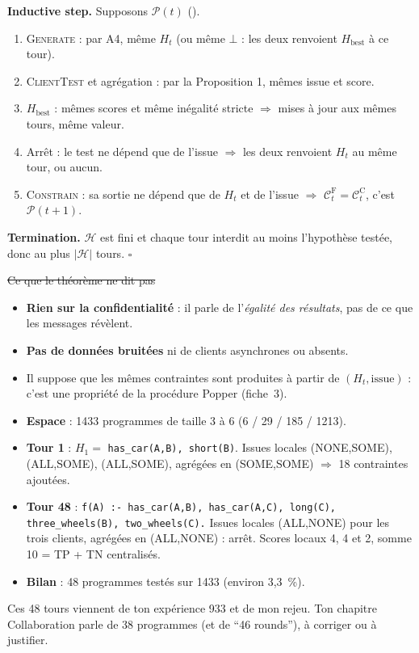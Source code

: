 \documentclass[10pt]{article}
\begin{document}
\textbf{Inductive step.} Supposons $\mathcal{P}(t)$ ().
\begin{enumerate}[leftmargin=14pt, itemsep=1pt, topsep=2pt]
  \item \textsc{Generate} : par A4, même $H_t$ (ou même $\bot$ : les deux renvoient $H_{\text{best}}$ à ce tour).
  \item \textsc{ClientTest} et agrégation : par la Proposition 1, mêmes issue et score.
  \item $H_{\text{best}}$ : mêmes scores et même inégalité stricte $\Rightarrow$ mises à jour aux mêmes tours, même valeur.
  \item Arrêt : le test ne dépend que de l'issue $\Rightarrow$ les deux renvoient $H_t$ au même tour, ou aucun.
  \item \textsc{Constrain} : sa sortie ne dépend que de $H_t$ et de l'issue $\Rightarrow$ $\mathcal{C}_t^{\mathrm F}=\mathcal{C}_t^{\mathrm C}$, c'est $\mathcal{P}(t+1)$.
\end{enumerate}
\textbf{Termination.} $\mathcal{H}$ est fini et chaque tour interdit au moins l'hypothèse testée, donc au plus $|\mathcal{H}|$ tours. \hfill $\square$

\st{Ce que le théorème ne dit pas}
\begin{itemize}
  \item \textbf{Rien sur la confidentialité} : il parle de l'\emph{égalité des résultats}, pas de ce que les messages révèlent.
  \item \textbf{Pas de données bruitées} ni de clients asynchrones ou absents.
  \item Il suppose que les mêmes contraintes sont produites à partir de $(H_t,\text{issue})$ : c'est une propriété de la procédure Popper (fiche~3).
\end{itemize}

\begin{itemize}
  \item \textbf{Espace} : 1433 programmes de taille 3 à 6 (6 / 29 / 185 / 1213).
  \item \textbf{Tour 1} : $H_1=$ \texttt{has\_car(A,B), short(B)}. Issues locales (NONE,SOME), (ALL,SOME), (ALL,SOME), agrégées en (SOME,SOME) $\Rightarrow$ 18 contraintes ajoutées.
  \item \textbf{Tour 48} : \texttt{f(A) :- has\_car(A,B), has\_car(A,C), long(C), three\_wheels(B), two\_wheels(C).}
        Issues locales (ALL,NONE) pour les trois clients, agrégées en (ALL,NONE) : arrêt. Scores locaux 4, 4 et 2, somme 10 = TP + TN centralisés.
  \item \textbf{Bilan} : 48 programmes testés sur 1433 (environ 3,3~\%).
\end{itemize}
\begin{piege}
Ces 48 tours viennent de ton expérience 933 et de mon rejeu. Ton chapitre Collaboration parle de 38 programmes (et de ``46 rounds''), à corriger ou à justifier.
\end{piege}
\end{document}
